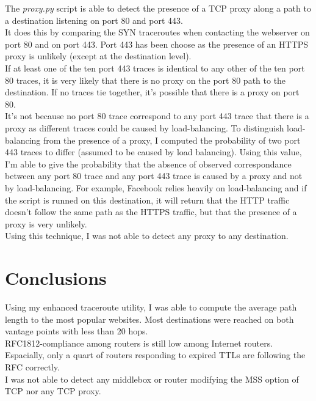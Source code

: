 \documentclass[journal]{IEEEtran}
\begin{document}
The \textit{proxy.py} script is able to detect the presence of a TCP proxy along a path to a destination listening on port 80 and port 443. \\
It does this by comparing the SYN traceroutes when contacting the webserver on port 80 and on port 443. Port 443 has been choose as the presence of an HTTPS proxy is unlikely (except at the destination level). \\
If at least one of the ten port 443 traces is identical to any other of the ten port 80 traces, it is very likely that there is no proxy on the port 80 path to the destination. If no traces tie together, it's possible that there is a proxy on port 80. \\
It's not because no port 80 trace correspond to any port 443 trace that there is a proxy as different traces could be caused by load-balancing. To distinguish load-balancing from the presence of a proxy, I computed the probability of two port 443 traces to differ (assumed to be caused by load balancing). Using this value, I'm able to give the probability that the absence of observed correspondance between any port 80 trace and any port 443 trace is caused by a proxy and not by load-balancing. For example, Facebook relies heavily on load-balancing and if the script is runned on this destination, it will return that the HTTP traffic doesn't follow the same path as the HTTPS traffic, but that the presence of a proxy is very unlikely. \\
Using this technique, I was not able to detect any proxy to any destination. 

\section{Conclusions}

Using my enhanced traceroute utility, I was able to compute the average path length to the most popular websites. Most destinations were reached on both vantage points with less than 20 hops. \\
RFC1812-compliance among routers is still low among Internet routers. Espacially, only a quart of routers responding to expired TTLs are following the RFC correctly. \\
I was not able to detect any middlebox or router modifying the MSS option of TCP nor any TCP proxy.


%
%
\end{document}
